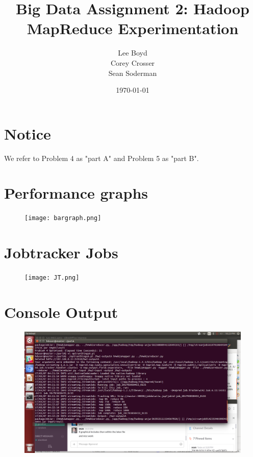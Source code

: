 \documentclass[14pt]{extarticle}
\begin{document}
\title{Big Data Assignment 2: Hadoop MapReduce Experimentation}
\author{Lee Boyd \\
        Corey Crosser \\
        Sean Soderman
        }
\date{\today}
\maketitle

\section{Notice}
We refer to Problem 4 as "part A" and Problem 5 as "part B".

\section{Performance graphs}

\begin{figure}[H]
\centering
\texttt{[image: bargraph.png]}
\caption{}
\end{figure}


\section{Jobtracker Jobs}
\begin{figure}[H]
\centering
\texttt{[image: JT.png]}
\caption{}
\end{figure}


\section{Console Output}
\begin{figure}[H]
\centering
\includegraphics[width=5.2in]{consolescrnshot.png}
\caption{}
\end{figure}
\end{document}

